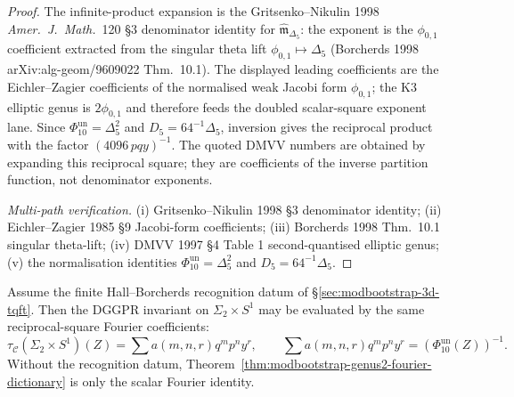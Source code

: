 \begin{proof}
The infinite-product expansion is the Gritsenko--Nikulin 1998
\emph{Amer.~J.~Math.}~120 \S 3 denominator identity for
$\widehat{\mathfrak m}_{\Delta_5}$: the exponent is the
$\phi_{0,1}$ coefficient extracted from the singular theta lift
$\phi_{0,1}\mapsto\Delta_5$ (Borcherds 1998
arXiv:alg-geom/9609022 Thm.~10.1). The displayed leading coefficients
are the Eichler--Zagier coefficients of the normalised weak Jacobi form
$\phi_{0,1}$; the K3 elliptic genus is $2\phi_{0,1}$ and therefore
feeds the doubled scalar-square exponent lane.  Since
$\Phi_{10}^{\mathrm{un}}=\Delta_5^2$ and
$D_5=64^{-1}\Delta_5$, inversion gives the reciprocal product with the
factor $(4096\,p q y)^{-1}$.  The quoted DMVV numbers are obtained by
expanding this reciprocal square; they are coefficients of the inverse
partition function, not denominator exponents.

\emph{Multi-path verification.}
(i) Gritsenko--Nikulin 1998 \S 3 denominator identity;
(ii) Eichler--Zagier 1985 \S 9 Jacobi-form coefficients;
(iii) Borcherds 1998 Thm.~10.1 singular theta-lift;
(iv) DMVV 1997 \S 4 Table 1 second-quantised elliptic genus;
(v) the normalisation identities
$\Phi_{10}^{\mathrm{un}}=\Delta_5^2$ and $D_5=64^{-1}\Delta_5$.
\end{proof}

\begin{remark}
\label{rem:modbootstrap-genus2-fourier-dictionary-tqft}
Assume the finite Hall--Borcherds recognition datum of
\S\ref{sec:modbootstrap-3d-tqft}.  Then the DGGPR invariant on
$\Sigma_2\times S^1$ may be evaluated by the same reciprocal-square
Fourier coefficients:
\[
 \tau_{\mathcal C}(\Sigma_2\!\times\! S^1)(Z)
 =
 \sum a(m,n,r)q^m p^n y^r,\qquad
 \sum a(m,n,r)q^m p^n y^r=(\Phi_{10}^{\mathrm{un}}(Z))^{-1}.
\]
Without the recognition datum, Theorem~\ref{thm:modbootstrap-genus2-fourier-dictionary}
is only the scalar Fourier identity.
\end{remark}

